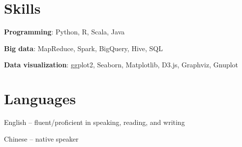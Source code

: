 \documentclass[margin,line]{resume}
\begin{document}
\begin{resume}


\section{\mysidestyle Skills}
\textbf{Programming}: Python, R, Scala, Java

\vspace{-3mm}
\textbf{Big data}: MapReduce, Spark, BigQuery, Hive, SQL

\vspace{-3mm}
\textbf{Data visualization}: ggplot2, Seaborn, Matplotlib, D3.js, Graphviz, Gnuplot


\section{\mysidestyle Languages}
English -- fluent/proficient in speaking, reading, and writing

\vspace{-3mm}

Chinese -- native speaker




\end{resume}
\end{document}
